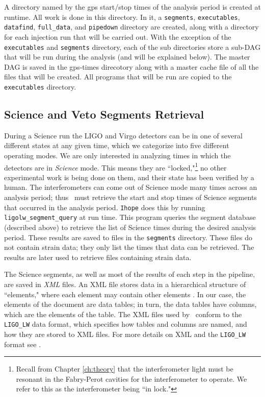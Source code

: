 A directory named by the gps start/stop times of the analysis period is created
at runtime. All work is done in this directory. In it, a \texttt{segments},
\texttt{executables}, \texttt{datafind}, \texttt{full\_data}, and
\texttt{pipedown} directory are created, along with a directory for each
injection run that will be carried out. With the exception of the
\texttt{executables} and \texttt{segments} directory, each of the sub
directories store a sub-\ac{DAG} that will be run during the analysis (and will
be explained below). The master \ac{DAG} is saved in the gps-times direcotory
along with a master cache file of all the files that will be created. All
programs that will be run are copied to the \texttt{executables} directory.

\subsection{Science and Veto Segments Retrieval}
\label{sec:science_segs_and_vetoes}

During a Science run the \ac{LIGO} and Virgo detectors can be in one of several
different states at any given time, which we categorize into five different
operating modes. We are only interested in analyzing times in which the
detectors are in {\it Science} mode. This means they are
``locked,"\footnote{Recall from Chapter \ref{ch:theory} that the interferometer
light must be resonant in the Fabry-Perot cavities for the interferometer to
operate. We refer to this as the interferometer being ``in lock."} no other
experimental work is being done on them, and their state has been verified by a
human. The interferometers can come out of Science mode many times across an
analysis period; thus \ihope~must retrieve the start and stop times of Science
segments that occurred in the analysis period. \verb|Ihope| does this by
running \texttt{ligolw\_segment\_query} \cite{BPP:segdb} at run time. This program queries the
segment database (described above) to retrieve the list of Science times during
the desired analysis period.  These results are saved to files in the
\texttt{segments} directory. These files do not contain strain data; they only
list the times that data can be retrieved. The results are later used to
retrieve files containing strain data.

The Science segments, as well as most of the results of each step in the
pipeline, are saved in \emph{XML} files. An XML file stores data in a
hierarchical structure of ``elements," where each element may contain other
elements \cite{tech:Williams:2005}. In our case, the elements of the document
are data tables; in turn, the data tables have columns, which are the elements
of the table. The XML files used by \ihope~conform to the \verb|LIGO_LW| data
format, which specifies how tables and columns are named, and how they are
stored to XML files. For more details on XML and the \verb|LIGO_LW| format see
\cite{tech:Williams:2005}.

